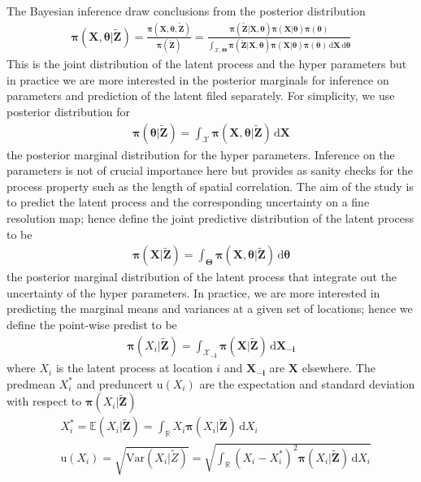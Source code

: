 \documentclass[a4paper,12pt]{article}
\newcommand{\ud}{\,\mathrm{d}}
\begin{document}
The Bayesian inference draw conclusions from the posterior distribution 
\begin{align}
\bm{\pi}(\bm{X}, \bm{\theta} | \bm{\tilde{Z}}) = \frac{\bm{\pi}(\bm{X},\bm{\theta}, \bm{\tilde{Z}})}{\bm{\pi}(\bm{\tilde{Z}})}
=\frac{\bm{\pi}(\bm{\tilde{Z}}| \bm{X}, \bm{\theta}) \bm{\pi}(\bm{X}|\bm{\theta})\bm{\pi}(\bm{\theta})}
{\int_{\bm{\mathcal{X}}, \bm{\Theta}}\bm{\pi}(\bm{\tilde{Z}}| \bm{X}, \bm{\theta}) \bm{\pi}(\bm{X}|\bm{\theta})\bm{\pi}(\bm{\theta})\ud\bm{X} \ud\bm{\theta}}
\end{align}
This is the joint distribution of the latent process and the hyper parameters but in practice we are more interested in the posterior marginals for inference on parameters and prediction of the latent filed separately. For simplicity, we use posterior distribution for 
\begin{align}
\bm{\pi}(\bm{\theta}| \bm{\tilde{Z}}) = 
\int_{\bm{\mathcal{X}}} \bm{\pi}(\bm{X}, \bm{\theta} | \bm{\tilde{Z}}) \ud \bm{X}
\end{align}
the posterior marginal distribution for the hyper parameters. Inference on the parameters is not of crucial importance here but provides as sanity checks for the process property such as the length of spatial correlation. The aim of the study is to predict the latent process and the corresponding uncertainty on a fine resolution map; hence define the joint predictive distribution of the latent process to be 
\begin{align}
\bm{\pi}(\bm{X}| \bm{\tilde{Z}}) = 
\int_{\bm{\Theta}} \bm{\pi}(\bm{X}, \bm{\theta} | \bm{\tilde{Z}}) \ud \bm{\theta}
\end{align}
the posterior marginal distribution of the latent process that integrate out the uncertainty of the hyper parameters. In practice, we are more interested in predicting the marginal means and variances  at a given set of locations; hence we define the point-wise \gls{predist} to be 
\begin{align}
\bm{\pi}(X_i | \bm{\tilde{Z}}) = \int_{\bm{\mathcal{X}_{-i}}} \bm{\pi}(\bm{X} | \bm{\tilde{Z}}) \ud \bm{X_{-i}}
\end{align}
where $X_i$ is the latent process at location $i$ and $\bm{X_{-i}}$ are $\bm{X}$ elsewhere. The \gls{predmean} $X_i^*$ and \gls{preduncert} $\mbox{u}(X_i)$ are the expectation and standard deviation with respect to $\bm{\pi}(X_i | \bm{\tilde{Z}})$
\begin{align}
&X_i^* = \mathbb{E}(X_i| \bm{\tilde{Z}}) = 
\int_{\mathbb{R}} X_i \bm{\pi}(X_i | \bm{\tilde{Z}}) \ud X_i \\
&\mbox{u}(X_i) = \sqrt{\mbox{Var}(X_i| \tilde{Z})} = \sqrt{\int_{\mathbb{R}} (X_i - X_i^*)^2\bm{\pi}(X_i | \bm{\tilde{Z}}) \ud X_i}
\end{align}
\end{document}
